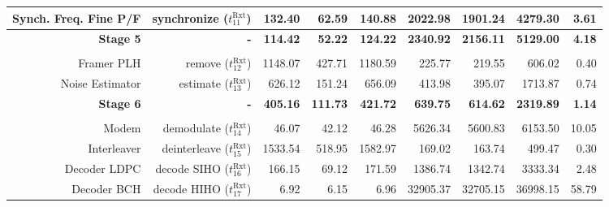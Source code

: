 \begin{table}[htp]
{{\begin{tabular}{r | r | r r r | r r r | r}
            Synch. Freq. Fine P/F &  synchronize ($t^\text{Rxt}_{11}$) &          132.40  &            62.59  &           140.88  &          2022.98  &          1901.24  &          4279.30  &          3.61  \\ \hline
                 \textbf{Stage 5} &                         \textbf{-} &  \textbf{114.42} &    \textbf{52.22} &   \textbf{124.22} &  \textbf{2340.92} &  \textbf{2156.11} &  \textbf{5129.00} &  \textbf{4.18} \\ %
                                  &                                    &                  &                   &                   &                   &                   &                   &                \\
                       Framer PLH &       remove ($t^\text{Rxt}_{12}$) &         1148.07  &           427.71  &          1180.59  &           225.77  &           219.55  &           606.02  &          0.40  \\
                  Noise Estimator &     estimate ($t^\text{Rxt}_{13}$) &          626.12  &           151.24  &           656.09  &           413.98  &           395.07  &          1713.87  &          0.74  \\ \hline
                 \textbf{Stage 6} &                         \textbf{-} &  \textbf{405.16} &   \textbf{111.73} &   \textbf{421.72} &   \textbf{639.75} &   \textbf{614.62} &  \textbf{2319.89} &  \textbf{1.14} \\ %
                                  &                                    &                  &                   &                   &                   &                   &                   &                \\
                            Modem &   demodulate ($t^\text{Rxt}_{14}$) &           46.07  &            42.12  &            46.28  &          5626.34  &          5600.83  &          6153.50  &         10.05  \\
                      Interleaver & deinterleave ($t^\text{Rxt}_{15}$) &         1533.54  &           518.95  &          1582.97  &           169.02  &           163.74  &           499.47  &          0.30  \\
                     Decoder LDPC &  decode SIHO ($t^\text{Rxt}_{16}$) &          166.15  &            69.12  &           171.59  &          1386.74  &          1342.74  &          3333.34  &          2.48  \\
                      Decoder BCH &  decode HIHO ($t^\text{Rxt}_{17}$) &            6.92  &             6.15  &             6.96  &         32905.37  &         32705.15  &         36998.15  &         58.79  \\

\end{tabular}}}
\end{table}
